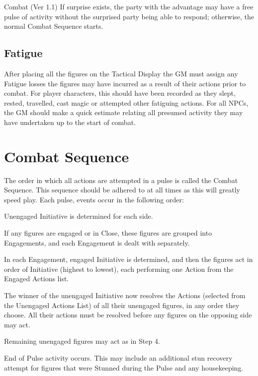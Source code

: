 \begin{Chapter}{Combat (Ver 1.1)}
If surprise exists, the party with the advantage may have a free pulse
of activity without the surprised party being able to respond;
otherwise, the normal Combat Sequence starts.

\subsection{Fatigue}

After placing all the figures on the Tactical Display the GM must
assign any Fatigue losses the figures may have incurred as a result of
their actions prior to combat.  For player characters, this should
have been recorded as they slept, rested, travelled, cast magic or
attempted other fatiguing actions. For all NPCs, the GM should make a
quick estimate relating all presumed activity they may have undertaken
up to the start of combat.

\section{Combat Sequence}

The order in which all actions are attempted in a pulse is called the
Combat Sequence.  This sequence should be adhered to at all times as
this will greatly speed play. Each pulse, events occur in the
following order:

\begin{Enumerate}
\item Unengaged Initiative is determined for each side.

\item If any figures are engaged or in Close, these figures are
  grouped into Engagements, and each Engagement is dealt with
  separately.

\item In each Engagement, engaged Initiative is determined, and then
  the figures act in order of Initiative (highest to lowest), each
  performing one Action from the Engaged Actions list.

\item The winner of the unengaged Initiative now resolves the Actions
  (selected from the Unengaged Actions List) of all their unengaged
  figures, in any order they choose.  All their actions must be
  resolved before any figures on the opposing side may act.

\item Remaining unengaged figures may act as in Step 4.

\item End of Pulse activity occurs.  This may include an additional
  stun recovery attempt for figures that were Stunned during the Pulse
  and any housekeeping.


\end{Enumerate}
\end{Chapter}
